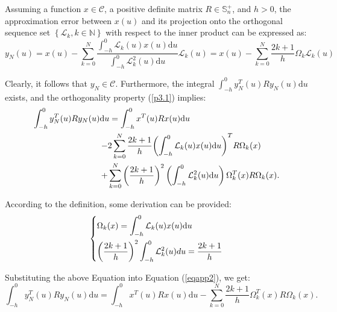 \documentclass[a4paper]{cas-sc}
\begin{document}
Assuming a function $x \in \mathcal{C}$, a positive definite matrix $R \in \mathbb{S}_n^+$, and $h > 0$, the approximation error between $x(u)$ and its projection onto the orthogonal sequence set $\left\{{\mathcal{L}_k},k \in \mathbb{N}\right\}$ with respect to the inner product can be expressed as:
\begin{equation}
  {y_N}\left( u \right) = x(u) - \sum\limits_{k = 0}^N {\frac{{\int_{ - h}^0 {{\mathcal{L}_k}} (u)x(u){\text{d}}u}}{{\int_{ - h}^0 {\mathcal{L}_k^2} (u){\text{d}}u}}} {\mathcal{L}_k}(u) = x\left( u \right) - \sum\limits_{k = 0}^N {\frac{{2k + 1}}{h}} {\Omega _k}{\mathcal{L}_k}(u)
  \label{eqapp1}
\end{equation}

Clearly, it follows that ${y_N} \in \mathcal{C}$. Furthermore, the integral $\int_{ - h}^0 {y_N^T} (u)R{y_N}(u){\text{d}}u$ exists, and the orthogonality property (\ref{p3.1}) implies:
\begin{equation}
  \begin{gathered}
    \int_{ - h}^0 {y_N^T} (u)R{y_N}(u){\text{d}}u = \int_{ - h}^0 {{x^T}} (u)Rx(u){\text{d}}u \hfill \\
    \quad \quad \quad \quad \quad \quad \quad \quad  - 2\sum\limits_{k = 0}^N {\frac{{2k + 1}}{h}} {\left( {\int_{ - h}^0 {{\mathcal{L}_k}} (u)x(u){\text{d}}u} \right)^T}R{\Omega _k}(x) \hfill \\
    \quad \quad \quad \quad \quad \quad \quad \quad  + \sum\limits_{k = 0}^N {{{\left( {\frac{{2k + 1}}{h}} \right)}^2}} \left( {\int_{ - h}^0 {\mathcal{L}_k^2} (u){\text{d}}u} \right)\Omega _k^T(x)R{\Omega _k}(x). \hfill \\
  \end{gathered}
  \label{eqapp2}
\end{equation}

According to the definition, some derivation can be provided:
\begin{equation}
  \left\{ \begin{gathered}
    {\Omega _k}(x) = \int_{ - h}^0 {{\mathcal{L}_k}} (u)x(u){\text{d}}u \hfill \\
    {\left( {\frac{{2k + 1}}{h}} \right)^2}\int_{ - h}^0 {\mathcal{L}_k^2} (u)du = \frac{{2k + 1}}{h} \hfill \\
  \end{gathered}  \right.
  \label{eqapp3}
\end{equation}

Substituting the above Equation into Equation (\ref{eqapp2}), we get:
\begin{equation}
  \int_{ - h}^0 {y_N^T} (u)R{y_N}(u){\text{d}}u = \int_{ - h}^0 {{x^T}} (u)Rx(u){\text{d}}u - \sum\limits_{k = 0}^N {\frac{{2k + 1}}{h}} \Omega _k^T(x)R{\Omega _k}(x).
  \label{eqapp4}
\end{equation}
\end{document}
